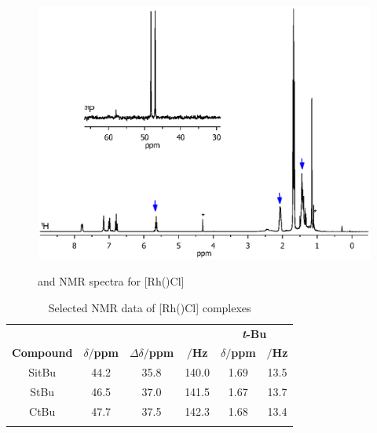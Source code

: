 \begin{figure}[htbp]
\begin{center}
\vspace{0.5cm}
\includegraphics[trim = 2.5cm 4.0cm 2.5cm 15cm, clip]{../NMR/7004B.eps}
\caption[\phosphorus{} and \proton{} NMR spectra for [Rh(\tBuxantphos)Cl{]}]{\phosphorus{} and \proton{} NMR spectra for [Rh(\tBuxantphos)Cl]}
\vspace{0.2cm}
\label{RhClnmr}
\end{center}
\end{figure}
\vspace{0.2cm}

\begin{table}[htbp]
\caption[Selected NMR data of [Rh(\tBuxantphos)Cl{]} complexes]{Selected NMR data of [Rh(\tBuxantphos)Cl] complexes}
\vspace{1em}
\label{table:rhodiumchloride}
\small
\begin{center}
\begin{tabular}{ c c c c c c}
	\toprule{}
	~ & \multicolumn{3}{c}{\bfseries{\phosphorus}} & \multicolumn{2}{c}{\bfseries{\proton{} \emph{t}-Bu}}\\
	\cmidrule(lr){2-4} \cmidrule(lr){5-6} 
	\bfseries{Compound}&\bfseries{$\delta/$ppm}&\bfseries{$\Delta\delta/$ppm}&\bfseries{\JRhP{}$/$Hz}&\bfseries{$\delta/$ppm}&\bfseries{\J $/$Hz}\\
	\midrule{}
	SitBu	&	44.2	&	35.8	&	140.0	& 1.69	& 13.5\\
	StBu		& 	46.5	&	37.0	&	141.5	& 1.67	& 13.7\\
	CtBu		&	47.7	&	37.5	&	142.3	& 1.68	& 13.4\\
	\bottomrule{}
\end{tabular}
\end{center}
\end{table}


